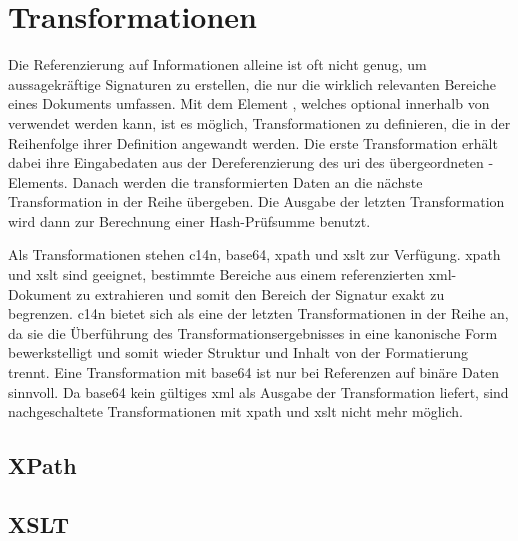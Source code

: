 \section{Transformationen}
\label{sec:XML-DSig:Transformationen}
Die Referenzierung auf Informationen alleine ist oft nicht genug, um aussagekräftige Signaturen zu erstellen, die nur die wirklich relevanten Bereiche eines
Dokuments umfassen. Mit dem Element , welches optional innerhalb von  verwendet werden kann, ist es möglich,
Transformationen zu definieren, die in der Reihenfolge ihrer Definition angewandt werden. Die erste Transformation erhält dabei ihre Eingabedaten aus der
Dereferenzierung des \gls{uri} des übergeordneten -Elements. Danach werden die transformierten Daten an die nächste Transformation in der
Reihe übergeben. Die Ausgabe der letzten Transformation wird dann zur Berechnung einer Hash-Prüfsumme benutzt.

Als Transformationen stehen \gls{c14n}, \gls{base64}, \gls{xpath} und \gls{xslt} zur Verfügung. \gls{xpath} und \gls{xslt} sind geeignet, bestimmte Bereiche aus
einem referenzierten \gls{xml}-Dokument zu extrahieren und somit den Bereich der Signatur exakt zu begrenzen. \gls{c14n} bietet sich als eine der letzten
Transformationen in der Reihe an, da sie die Überführung des Transformationsergebnisses in eine kanonische Form bewerkstelligt und somit wieder Struktur und
Inhalt von der Formatierung trennt. Eine Transformation mit \gls{base64} ist nur bei Referenzen auf binäre Daten sinnvoll. Da \gls{base64} kein gültiges
\gls{xml} als Ausgabe der Transformation liefert, sind nachgeschaltete Transformationen mit \gls{xpath} und \gls{xslt} nicht mehr möglich.

\subsection{XPath}
\label{sec:XML-DSig:Transformationen:XPath}

\subsection{XSLT}
\label{sec:XML-DSig:Transformationen:XSLT}

